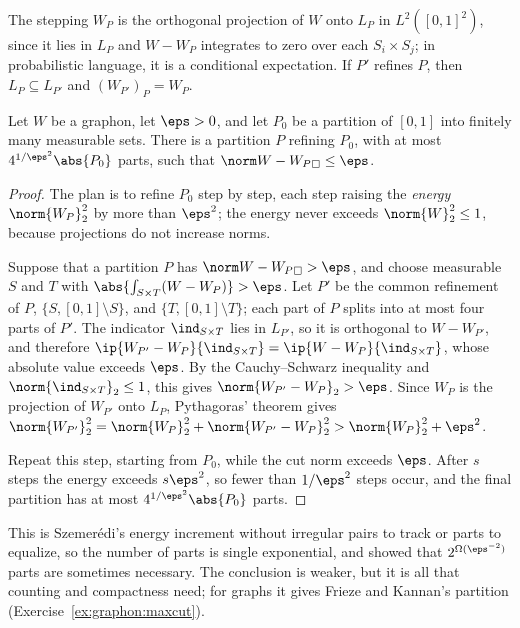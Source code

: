 \begin{refsection}
The stepping $W_P$ is the orthogonal projection of $W$ onto $L_P$ in $L^2([0,1]^2)$, since it lies in $L_P$ and $W-W_P$ integrates to zero over each $S_i\times S_j$; in probabilistic language, it is a conditional expectation. If $P'$ refines $P$, then $L_P\subseteq L_{P'}$ and $(W_{P'})_P=W_P$.

\begin{lemma}\label{lem:graphon:weakreg}
Let $W$ be a graphon, let $\eps>0$, and let $P_0$ be a partition of $[0,1]$ into finitely many measurable sets. There is a partition $P$ refining $P_0$, with at most $4^{1/\eps^2}\abs{P_0}$ parts, such that $\graphoncut{W-W_P}\le\eps$.
\end{lemma}


\begin{proof}
The plan is to refine $P_0$ step by step, each step raising the \emph{energy} $\norm{W_P}_2^2$ by more than $\eps^2$; the energy never exceeds $\norm{W}_2^2\le1$, because projections do not increase norms.

Suppose that a partition $P$ has $\graphoncut{W-W_P}>\eps$, and choose measurable $S$ and $T$ with $\abs{\int_{S\times T}(W-W_P)}>\eps$. Let $P'$ be the common refinement of $P$, $\{S,[0,1]\setminus S\}$, and $\{T,[0,1]\setminus T\}$; each part of $P$ splits into at most four parts of $P'$. The indicator $\ind_{S\times T}$ lies in $L_{P'}$, so it is orthogonal to $W-W_{P'}$, and therefore $\ip{W_{P'}-W_P}{\ind_{S\times T}}=\ip{W-W_P}{\ind_{S\times T}}$, whose absolute value exceeds $\eps$. By the Cauchy--Schwarz inequality and $\norm{\ind_{S\times T}}_2\le1$, this gives $\norm{W_{P'}-W_P}_2>\eps$. Since $W_P$ is the projection of $W_{P'}$ onto $L_P$, Pythagoras' theorem gives $\norm{W_{P'}}_2^2=\norm{W_P}_2^2+\norm{W_{P'}-W_P}_2^2>\norm{W_P}_2^2+\eps^2$.

Repeat this step, starting from $P_0$, while the cut norm exceeds $\eps$. After $s$ steps the energy exceeds $s\eps^2$, so fewer than $1/\eps^2$ steps occur, and the final partition has at most $4^{1/\eps^2}\abs{P_0}$ parts.
\end{proof}

This is Szemer\'edi's energy increment without irregular pairs to track or parts to equalize, so the number of parts is single exponential, and \textcite{ConlonFox2012} showed that $2^{\Omega(\eps^{-2})}$ parts are sometimes necessary. The conclusion is weaker, but it is all that counting and compactness need; for graphs it gives Frieze and Kannan's partition (Exercise~\ref{ex:graphon:maxcut}).


\end{refsection}
